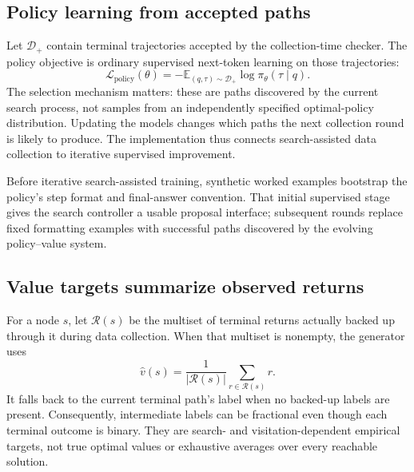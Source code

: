 \documentclass[11pt,letterpaper]{article}
\begin{document}
\subsection{Policy learning from accepted paths}
Let $\mathcal D_+$ contain terminal trajectories accepted by the collection-time checker. The policy objective is ordinary supervised next-token learning on those trajectories:
\begin{equation}
\mathcal L_{\mathrm{policy}}(\theta)
=-\mathbb E_{(q,\tau)\sim\mathcal D_+}\log\pi_\theta(\tau\mid q).
\end{equation}
The selection mechanism matters: these are paths discovered by the current search process, not samples from an independently specified optimal-policy distribution. Updating the models changes which paths the next collection round is likely to produce. The implementation thus connects search-assisted data collection to iterative supervised improvement.

Before iterative search-assisted training, synthetic worked examples bootstrap the policy's step format and final-answer convention. That initial supervised stage gives the search controller a usable proposal interface; subsequent rounds replace fixed formatting examples with successful paths discovered by the evolving policy--value system.

\subsection{Value targets summarize observed returns}
For a node $s$, let $\mathcal R(s)$ be the multiset of terminal returns actually backed up through it during data collection. When that multiset is nonempty, the generator uses
\begin{equation}
\widehat v(s)=\frac{1}{|\mathcal R(s)|}\sum_{r\in\mathcal R(s)}r.
\label{eq:target}
\end{equation}
It falls back to the current terminal path's label when no backed-up labels are present. Consequently, intermediate labels can be fractional even though each terminal outcome is binary. They are search- and visitation-dependent empirical targets, not true optimal values or exhaustive averages over every reachable solution.
\end{document}
